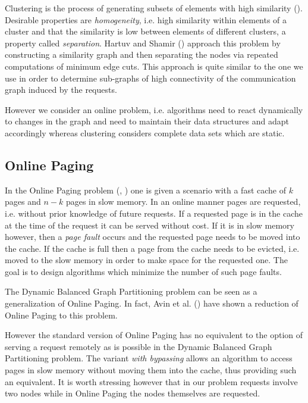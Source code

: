 \documentclass[a4paper,xcolor=dvipsnames, tikz, 12pt]{article}
\theoremstyle{definition}
\begin{document}
	Clustering is the process of generating subsets of elements with high similarity (\cite{Hartuv2000}). Desirable properties are \textit{homogeneity}, i.e. high similarity within elements of a cluster and that the similarity is low between elements of different clusters, a property called \textit{separation}. Hartuv and Shamir (\cite{Hartuv2000}) approach this problem by constructing a similarity graph and then separating the nodes via repeated computations of minimum edge cuts. This approach is quite similar to the one we use in order to determine sub-graphs of high connectivity of the communication graph induced by the requests.
	
	However we consider an online problem, i.e. algorithms need to react dynamically to changes in the graph and need to maintain their data structures and adapt accordingly whereas clustering considers complete data sets which are static.
	

	\subsection{Online Paging}
	In the Online Paging problem (\cite{Fiat2002}, \cite{Epstein2011}) one is given a scenario with a fast cache of $k$ pages and $n-k$ pages in slow memory. In an online manner pages are requested, i.e. without prior knowledge of future requests. If a requested page is in the cache at the time of the request it can be served without cost. If it is in slow memory however, then a \textit{page fault} occurs and the requested page needs to be moved into the cache. If the cache is full then a page from the cache needs to be evicted, i.e. moved to the slow memory in order to make space for the requested one. The goal is to design algorithms which minimize the number of such page faults. 
	
	The Dynamic Balanced Graph Partitioning problem can be seen as a generalization of Online Paging. In fact, Avin et al. (\cite{Avin2015}) have shown a reduction of Online Paging to this problem.
	
	However the standard version of Online Paging has no equivalent to the option of serving a request remotely as is possible in the Dynamic Balanced Graph Partitioning problem. The variant \textit{with bypassing} allows an algorithm to access pages in slow memory without moving them into the cache, thus providing such an equivalent. It is worth stressing however that in our problem requests involve two nodes while in Online Paging the nodes themselves are requested.
	
\end{document}
